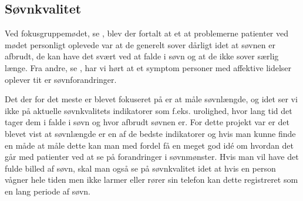 \subsection{Søvnkvalitet}
Ved fokusgruppemødet, se \citep[Kapitel 1, Sektion 5]{misc:faellesrapp}, blev der fortalt at et at problemerne patienter ved mødet personligt oplevede var at de generelt sover dårligt idet at søvnen er afbrudt, de kan have det svært ved at falde i søvn og at de ikke sover særlig længe.
Fra andre, se \citep[Kapitel 1, Sektion 3 og 4]{misc:faellesrapp}, har vi hørt at et symptom personer med affektive lidelser oplever tit er søvnforandringer. 

Det der for det meste er blevet fokuseret på er at måle søvnlængde, og idet ser vi ikke på aktuelle søvnkvalitets indikatorer som f.eks. urolighed, hvor lang tid det tager dem i falde i søvn og hvor afbrudt søvnen er.
For dette projekt var er det blevet vist at søvnlængde er en af de bedste indikatorer og hvis man kunne finde en måde at måle dette kan man med fordel få en meget god idé om hvordan det går med patienter ved at se på forandringer i søvnmønster. 
Hvis man vil have det fulde billed af søvn, skal man også se på søvnkvalitet idet at hvis en person vågner hele tiden men ikke larmer eller rører sin telefon kan dette registreret som en lang periode af søvn.